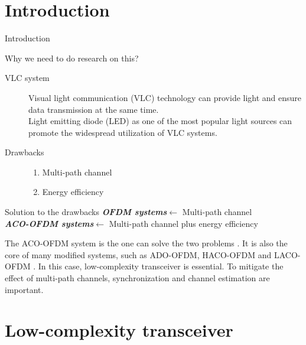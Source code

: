 \documentclass[8 pt]{beamer} %
\begin{document}
\section{Introduction}
\begin{frame}{Introduction}
\begin{block}{Why we need to do research on this?}
\begin{description}
\item[VLC system] Visual light communication (VLC) technology\cite{Chi2015,Qian2016Synchronisation} can provide light and ensure data transmission at the same time.\\
Light emitting diode (LED) \cite{tsonev20143,ferreira2016high} as one of the most popular light sources can promote the widespread utilization of VLC systems.
\item[Drawbacks] 
\begin{enumerate}
\item Multi-path channel
\item Energy efficiency
\end{enumerate}
\end{description}

\end{block}
\pause

\begin{block}{Solution to the drawbacks}
\textbf{\textit{OFDM systems}}$\leftarrow$ Multi-path channel \\
\textbf{\textit{ACO-OFDM systems}}$\leftarrow$ Multi-path channel plus energy efficiency
\end{block}
\pause 

The ACO-OFDM system is the one can solve the two problems \cite{Dissanayake2013Comparison}. 
It is also the core of many modified systems, such as ADO-OFDM, HACO-OFDM and LACO-OFDM \cite{yang2016novel,Wang2017Optical}. In this case, low-complexity transceiver is essential. 
To mitigate the effect of multi-path channels, synchronization and channel estimation are important.

\end{frame}

\section{Low-complexity transceiver}
\end{document}

